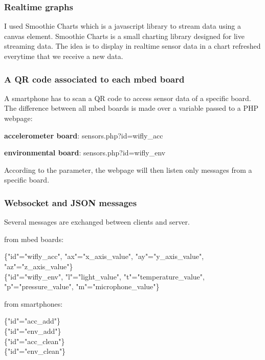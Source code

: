 \documentclass[pdftex,10pt,a4paper]{report}
\newenvironment{packed_item}{
\begin{itemize}
  \setlength{\itemsep}{1pt}
  \setlength{\parskip}{0pt}
  \setlength{\parsep}{0pt}
}{\end{itemize}}
\begin{document}
\subsubsection{Realtime graphs}
I used Smoothie Charts which is a javascript library to stream data using a canvas element. Smoothie Charts is a small charting library designed for live streaming data. The idea is to display in realtime sensor data in a chart refreshed everytime that we receive a new data.

\subsubsection{A QR code associated to each mbed board}
A smartphone has to scan a QR code to access sensor data of a specific board. The difference between all mbed boards is made over a variable passed to a PHP webpage:
\begin{packed_item}
	\item \textbf{accelerometer board}: sensors.php?id=wifly\_acc
	\item \textbf{environmental board}: sensors.php?id=wifly\_env
\end{packed_item}

According to the parameter, the webpage will then listen only messages from a specific board.

\subsubsection{Websocket and JSON messages}
Several messages are exchanged between clients and server. 
\begin{packed_item}
	\item from mbed boards: 
		\begin{center}
				\{"id"="wifly\_acc", "ax"="x\_axis\_value", "ay"="y\_axis\_value", "az"="z\_axis\_value"\} \\
				\{"id"="wifly\_env", "l"="light\_value", "t"="temperature\_value", "p"="pressure\_value", "m"="microphone\_value"\}
		\end{center}
	\item from smartphones:
		\begin{center}
				\{"id"="acc\_add"\} \\
				\{"id"="env\_add"\} \\
				\{"id"="acc\_clean"\} \\
				\{"id"="env\_clean"\}
		\end{center}
		
\end{packed_item}
\end{document}
